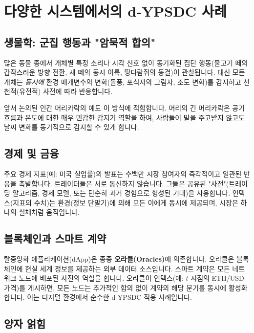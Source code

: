\documentclass[11pt,a4paper]{article}
\begin{document}
	\section{다양한 시스템에서의 d‑YPSDC 사례}
	
	\subsection{생물학: 군집 행동과 "암묵적 합의"}
	
	많은 동물 종에서 개체별 특정 소리나 시각 신호 없이 동기화된 집단 행동(물고기 떼의 갑작스러운 방향 전환, 새 떼의 동시 이륙, 땅다람쥐의 동결)이 관찰됩니다. 대신 모든 개체는 \emph{동시에} 환경 매개변수의 변화(돌풍, 포식자의 그림자, 조도 변화)를 감지하고 선천적(유전적) 사전에 따라 반응합니다.
	
	앞서 논의된 인간 머리카락의 예도 이 방식에 적합합니다. 머리의 긴 머리카락은 공기 흐름과 온도에 대한 매우 민감한 감지기 역할을 하여, 사람들이 말을 주고받지 않고도 날씨 변화를 동기적으로 감지할 수 있게 합니다.
	
	\subsection{경제 및 금융}
	
	주요 경제 지표(예: 미국 실업률)의 발표는 수백만 시장 참여자의 즉각적이고 일관된 반응을 촉발합니다. 트레이더들은 서로 통신하지 않습니다. 그들은 공유된 "사전"(트레이딩 알고리즘, 경제 모델, 또는 단순히 과거 경험으로 형성된 기대)을 사용합니다. 인덱스(지표의 수치)는 환경(정보 단말기)에 의해 모든 이에게 동시에 제공되며, 시장은 하나의 실체처럼 움직입니다.
	
	\subsection{블록체인과 스마트 계약}
	
	탈중앙화 애플리케이션(dApp)은 종종 \textbf{오라클(Oracles)}에 의존합니다. 오라클은 블록체인에 현실 세계 정보를 제공하는 외부 데이터 소스입니다. 스마트 계약은 모든 네트워크 노드에 배포된 사전의 역할을 합니다. 오라클이 인덱스(예: \(t\) 시점의 ETH/USD 가격)를 게시하면, 모든 노드는 추가적인 합의 없이 계약의 해당 분기를 동시에 활성화합니다. 이는 디지털 환경에서 순수한 d‑YPSDC 적용 사례입니다.
	
	\subsection{양자 얽힘}
	
\end{document}
